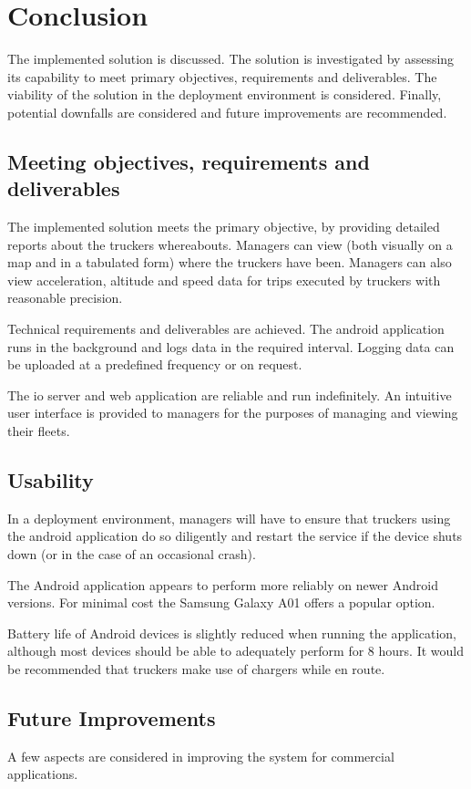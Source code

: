 \section{Conclusion}
The implemented solution is discussed.
The solution is investigated by assessing its capability to meet primary objectives, requirements and deliverables.
The viability of the solution in the deployment environment is considered.
Finally, potential downfalls are considered and future improvements are recommended.

\subsection{Meeting objectives, requirements and deliverables}
The implemented solution meets the primary objective, by providing detailed reports about the truckers whereabouts.
Managers can view (both visually on a map and in a tabulated form) where the truckers have been.
Managers can also view acceleration, altitude and speed data for trips executed by truckers with reasonable precision.

Technical requirements and deliverables are achieved.
The android application runs in the background and logs data in the required interval.
Logging data can be uploaded at a predefined frequency or on request.

The \ac{io} server and web application are reliable and run indefinitely.
An intuitive user interface is provided to managers for the purposes of managing and viewing their fleets.

\subsection{Usability}
In a deployment environment, managers will have to ensure that truckers using the android application do so diligently and restart the service if the device shuts down (or in the case of an occasional crash).

The Android application appears to perform more reliably on newer Android versions.
For minimal cost the Samsung Galaxy A01 offers a popular option.

Battery life of Android devices is slightly reduced when running the application, although most devices should be able to adequately perform for 8 hours.
It would be recommended that truckers make use of chargers while en route.

\subsection{Future Improvements}
A few aspects are considered in improving the system for commercial applications.

